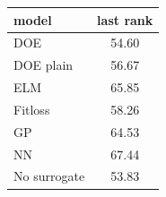 \begin{tabular}{|lc|}
\hline
model & last rank\\
\hline
DOE & 54.60 \\
DOE plain & 56.67 \\
ELM & 65.85 \\
Fitloss & 58.26 \\
GP & 64.53 \\
NN & 67.44 \\
No surrogate & 53.83 \\
\hline
\end{tabular}
